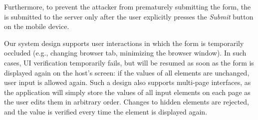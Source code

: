  Furthermore, to prevent the attacker from prematurely submitting the form, the \POI is submitted to the server only after the user explicitly presses the \emph{Submit} button on the mobile device.


Our system design supports user interactions in which the form is temporarily occluded (e.g., changing browser tab, minimizing the browser window).
In such cases, UI verification temporarily fails, but will be resumed as soon as the form is displayed again on the host's screen: if the values of all elements are unchanged, user input is allowed again. Such a design also supports multi-page interfaces, as the application will simply store the values of all input elements on each page as the user edits them in arbitrary order. Changes to hidden elements are rejected, and the value is verified every time the element is displayed again.